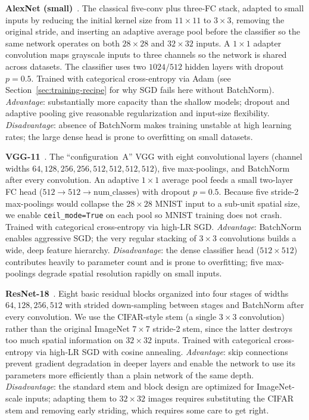 \documentclass[conference,10pt]{IEEEtran}
\begin{document}
\noindent\textbf{AlexNet (small)}~\cite{krizhevsky2012imagenet}. The
classical five-conv plus three-FC stack, adapted to small inputs by
reducing the initial kernel size from $11\!\times\!11$ to
$3\!\times\!3$, removing the original stride, and inserting an
adaptive average pool before the classifier so the same network
operates on both $28\!\times\!28$ and $32\!\times\!32$ inputs. A
$1\!\times\!1$ adapter convolution maps grayscale inputs to three
channels so the network is shared across datasets. The classifier
uses two $1024 / 512$ hidden layers with dropout $p\!=\!0.5$.
Trained with categorical cross-entropy via Adam
(see Section~\ref{sec:training-recipe} for why SGD fails here without
BatchNorm).
\textit{Advantage}: substantially more capacity than the shallow
models; dropout and adaptive pooling give reasonable regularization
and input-size flexibility.
\textit{Disadvantage}: absence of BatchNorm makes training unstable
at high learning rates; the large dense head is prone to overfitting
on small datasets.

\noindent\textbf{VGG-11}~\cite{simonyan2015very}. The
``configuration~A'' VGG with eight convolutional layers (channel
widths $64, 128, 256, 256, 512, 512, 512, 512$), five max-poolings,
and BatchNorm \cite{ioffe2015batch} after every convolution. An
adaptive $1\!\times\!1$ average pool feeds a small two-layer FC head
($512\!\to\!512\!\to\!\text{num\_classes}$) with dropout
$p\!=\!0.5$. Because five stride-2 max-poolings would collapse the
$28\!\times\!28$ MNIST input to a sub-unit spatial size, we enable
\verb|ceil_mode=True| on each pool so MNIST training does not crash.
Trained with categorical cross-entropy via high-LR SGD.
\textit{Advantage}: BatchNorm enables aggressive SGD; the very regular
stacking of $3\!\times\!3$ convolutions builds a wide, deep feature
hierarchy.
\textit{Disadvantage}: the dense classifier head ($512\!\times\!512$)
contributes heavily to parameter count and is prone to overfitting;
five max-poolings degrade spatial resolution rapidly on small inputs.

\noindent\textbf{ResNet-18}~\cite{he2016deep}. Eight basic residual
blocks organized into four stages of widths $64, 128, 256, 512$ with
strided down-sampling between stages and BatchNorm after every
convolution. We use the CIFAR-style stem (a single $3\!\times\!3$
convolution) rather than the original ImageNet $7\!\times\!7$
stride-2 stem, since the latter destroys too much spatial information
on $32\!\times\!32$ inputs. Trained with categorical cross-entropy
via high-LR SGD with cosine annealing.
\textit{Advantage}: skip connections prevent gradient degradation in
deeper layers and enable the network to use its parameters more
efficiently than a plain network of the same depth.
\textit{Disadvantage}: the standard stem and block design are
optimized for ImageNet-scale inputs; adapting them to $32\!\times\!32$
images requires substituting the CIFAR stem and removing early
striding, which requires some care to get right.
\end{document}
